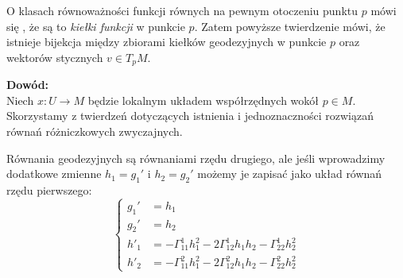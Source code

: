 \begin{frame}


\begin{uwaga}
O klasach równoważności funkcji równych na pewnym otoczeniu punktu $p$ mówi się , że są to \textit{kiełki funkcji} w punkcie $p$. Zatem powyższe twierdzenie mówi, że istnieje bijekcja między zbiorami kiełków geodezyjnych w punkcie $p$ oraz wektorów stycznych $v\in T_pM$.
\end{uwaga}

\pause \textcolor{ared}{\textbf{Dowód:}}\\
Niech $x\colon U\to M$ będzie lokalnym układem współrzędnych wokół $p\in M$.
Skorzystamy z twierdzeń dotyczących istnienia i jednoznaczności rozwiązań równań różniczkowych zwyczajnych. 

\end{frame}
\begin{frame}

Równania geodezyjnych są równaniami rzędu drugiego, ale jeśli wprowadzimy dodatkowe zmienne $h_1=g_1'$ i $h_2=g_2'$ możemy je zapisać jako układ równań rzędu pierwszego:
\pause \begin{equation}\label{eqn:uniq-geodes}
\left\{
\begin{aligned}
g_1'&=h_1\\
g_2'&=h_2\\
h'_1&=-\Gamma^1_{11}h_1^2-2\Gamma^1_{12}h_1h_2-\Gamma^1_{22}h_2^2\\
h'_2&=-\Gamma^2_{11}h_1^2-2\Gamma^2_{12}h_1h_2-\Gamma^2_{22}h_2^2
\end{aligned}
\right.
\end{equation}


\end{frame}
